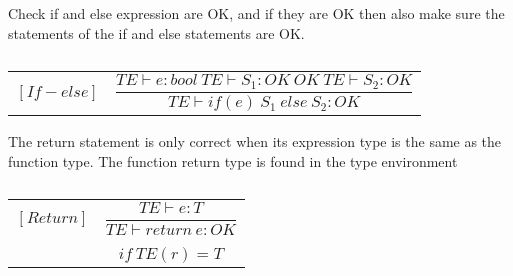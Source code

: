Check if and else expression are OK, and if they are OK then also make sure the statements of the if and else statements are OK.
\begin{table}[H]
    \begin{center}
    \begin{longtable}[c] { r c }
        $[If - else]$ 
        & 
        \( \dfrac{T E  \vdash e  :  bool \ T E \vdash S_1 : OK \ OK \ T E \vdash S_2 : OK}
        {T E \vdash if(e) \ S_1 \ else \ S_2 : OK} \)

    \end{longtable}
    \caption{}\label{s-empty}
        \end{center}
\end{table}

The return statement is only correct when its expression type is the same as the function type. The function return type is found in the type environment
\begin{table}[H]
    \begin{center}
    \begin{longtable}[c] { r c }
        $[Return]$ 
        & 
        \( \dfrac{T E  \vdash e  :  T}{T E \vdash return \ e : OK} \)
         \\ \\
        & 
        \( {if \ TE(r) = T } \)

    \end{longtable}
    \caption{}\label{s-empty}
        \end{center}
\end{table}








